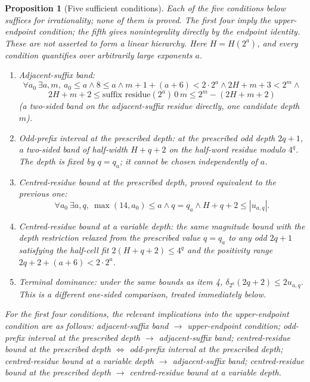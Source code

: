 \documentclass[11pt]{article}
\theoremstyle{plain}
\newtheorem{prop}[thm]{Proposition}
\theoremstyle{definition}
\theoremstyle{remark}
\begin{document}
\begin{prop}[Five sufficient conditions]
\label{prop:te-chain}
Each of the five conditions below suffices for irrationality; none of them is proved. The first
four imply the upper-endpoint condition;
the fifth gives nonintegrality directly by the endpoint identity. These
are not asserted to form a linear hierarchy. Here $H=H(2^a)$, and every
condition quantifies over arbitrarily large exponents $a$.
\begin{enumerate}[leftmargin=*]
  \item \emph{Adjacent-suffix band}:
    \[
      \forall a_0\ \exists a,m,\ a_0\le a \wedge 8\le a \wedge m{+}1{+}(a{+}6)<2\cdot 2^a \wedge
      2H{+}m{+}3 < 2^m \wedge
    \]
    \[
      2H{+}m{+}2 \le \text{suffix residue}(2^a)\,0\,m \le 2^m - (2H{+}m{+}2)
    \]
    (a two-sided band on the adjacent-suffix residue directly, one candidate depth $m$).
  \item \emph{Odd-prefix interval at the prescribed depth}: at the prescribed odd depth $2q{+}1$, a two-sided band of half-width
    $H{+}q{+}2$ on the half-word residue modulo $4^q$. The depth is fixed
    by $q=q_a$; it cannot be chosen independently of $a$.
  \item \emph{Centred-residue bound at the prescribed depth}, \emph{proved equivalent} to the previous one:
    \[
      \forall a_0\ \exists a,q,\ \max(14,a_0)\le a \wedge q=q_a
      \wedge H{+}q{+}2 \le |u_{a,q}| .
    \]
  \item \emph{Centred-residue bound at a variable depth}: the same magnitude bound with the depth restriction relaxed from
    the prescribed value $q=q_a$ to any odd $2q{+}1$ satisfying the half-cell fit
    $2(H{+}q{+}2)\le 4^q$ and the positivity range $2q{+}2{+}(a{+}6)<2\cdot 2^a$.
  \item \emph{Terminal dominance}: under the same bounds as item 4,
    $\delta_{2^a}(2q+2)\le2u_{a,q}$. This is a different one-sided
    comparison, treated immediately below.
\end{enumerate}
For the first four conditions, the relevant implications into the
upper-endpoint condition are as follows:
adjacent-suffix band $\to$ upper-endpoint condition; odd-prefix interval at the prescribed depth
$\to$ adjacent-suffix band; centred-residue bound at the prescribed depth
$\Leftrightarrow$ odd-prefix interval at the prescribed depth;
centred-residue bound at a variable depth $\to$ adjacent-suffix band;
centred-residue bound at the prescribed depth $\to$ centred-residue bound at a variable depth.
\end{prop}
\end{document}
